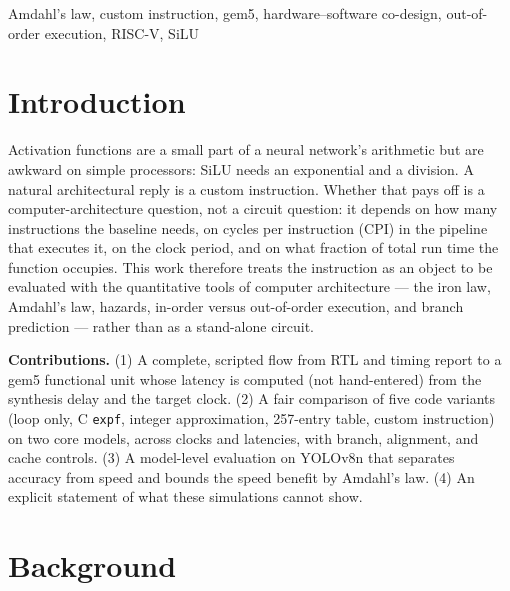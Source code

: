\documentclass[conference]{IEEEtran}
\begin{document}
\begin{IEEEkeywords}
Amdahl's law, custom instruction, gem5, hardware--software co-design, out-of-order execution, RISC-V, SiLU
\end{IEEEkeywords}

\section{Introduction}
Activation functions are a small part of a neural network's arithmetic but are awkward on simple processors: SiLU \cite{elfwing2018,ramachandran2017} needs an exponential and a division. A natural architectural reply is a custom instruction. Whether that pays off is a computer-architecture question, not a circuit question: it depends on how many instructions the baseline needs, on cycles per instruction (CPI) in the pipeline that executes it, on the clock period, and on what fraction of total run time the function occupies. This work therefore treats the instruction as an object to be evaluated with the quantitative tools of computer architecture --- the iron law, Amdahl's law, hazards, in-order versus out-of-order execution, and branch prediction --- rather than as a stand-alone circuit.

\textbf{Contributions.}
(1) A complete, scripted flow from RTL and timing report to a gem5 functional unit whose latency is computed (not hand-entered) from the synthesis delay and the target clock.
(2) A fair comparison of five code variants (loop only, C \texttt{expf}, integer approximation, 257-entry table, custom instruction) on two core models, across clocks and latencies, with branch, alignment, and cache controls.
(3) A model-level evaluation on YOLOv8n that separates accuracy from speed and bounds the speed benefit by Amdahl's law.
(4) An explicit statement of what these simulations cannot show.

\section{Background}
\end{document}

